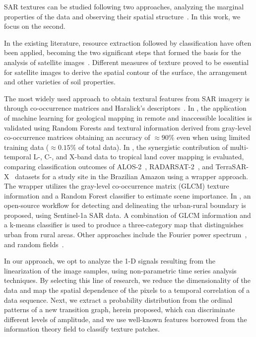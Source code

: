 \documentclass[journal]{IEEEtran}
\begin{document}
SAR textures can be studied following two approaches, analyzing the marginal properties of the data and observing their spatial structure~\cite{numbisi2018multi}.
In this work, we focus on the second.

In the existing literature, resource extraction followed by classification have often been applied, becoming the two significant steps that formed the basis for the analysis of satellite images~\cite{feng2014amplitude}.
Different measures of texture proved to be essential for satellite images to derive the spatial contour of the surface, the arrangement and other varieties of soil properties.

The most widely used approach to obtain textural features from SAR imagery is through co-occurrence matrices and Haralick's descriptors~\cite{yu2019detection}.
In \cite{radford2018geological},  the application of machine learning for geological mapping in remote and inaccessible localities is validated using  Random Forests and textural information derived from gray-level co-occurrence matrices obtaining an accuracy of $\approx90\%$ even when using limited training data ($\approx0.15\%$ of total data). 
In \cite{hagensieker2018evaluation}, the synergistic contribution of multi-temporal L-, C-, and X-band data to tropical land cover mapping is evaluated, comparing classification outcomes of ALOS-2~\cite{kankaku2013alos}, RADARSAT-2~\cite{morena2004introduction}, and TerraSAR-X~\cite{breit2009terrasar} 
datasets for a study site in the Brazilian Amazon using a wrapper approach. 
The wrapper utilizes the gray-level co-occurrence matrix (GLCM)
texture information and a  Random Forest classifier to estimate scene importance. 
In \cite{storie2018urban}, an open-source workflow for detecting and delineating the urban-rural boundary is proposed, using Sentinel-1a SAR data.
A combination of GLCM information and a k-means classifier is used to produce a three-category map that distinguishes urban from rural areas. 
Other approaches include the Fourier power  spectrum~\cite{Florindo2012Fractal}, and random fields~\cite{zhu2016antarctic}.

In our approach, we opt to analyze the 1-D signals resulting from the linearization of the image samples, using non-parametric time series analysis techniques.
By selecting this line of research, we reduce the dimensionality of the data and map the spatial dependence of the pixels to a temporal correlation of a data sequence.
Next, we extract a probability distribution from the ordinal patterns of a new transition graph, herein proposed,  which can discriminate different levels of amplitude, and we use well-known features borrowed from the information theory field to classify texture patches.
	
\end{document}

